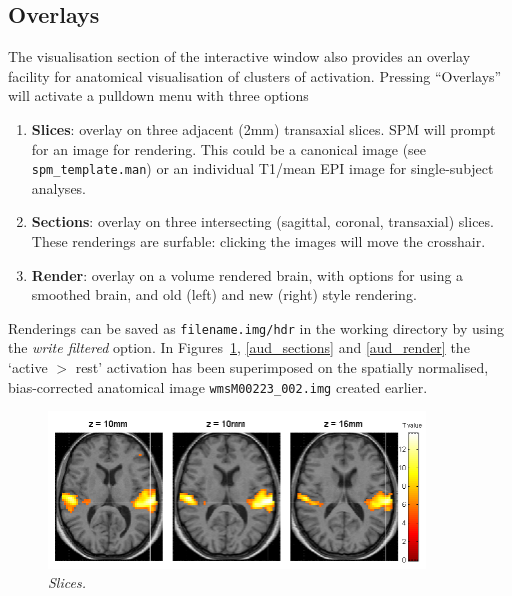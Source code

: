 \subsection{Overlays}

The visualisation section of the interactive window also provides an overlay facility for anatomical visualisation of clusters of activation. Pressing ``Overlays'' will activate a pulldown menu with three options

\begin{enumerate}
\item \textbf{Slices}: overlay on three adjacent (2mm) transaxial slices. SPM will prompt for an image for rendering. This could be a canonical image (see \texttt{spm\_template.man}) or an individual T1/mean EPI image for single-subject analyses.
\item \textbf{Sections}: overlay on three intersecting (sagittal, coronal, transaxial) slices. These renderings are surfable: clicking the images will move the crosshair.
\item \textbf{Render}: overlay on a volume rendered brain, with options for using a smoothed brain, and old (left) and new (right) style rendering.
\end{enumerate}

Renderings can be saved as \texttt{filename.img/hdr} in the working directory by using the {\em write filtered} option. In Figures~\ref{aud_slices}, \ref{aud_sections} and \ref{aud_render} the `active $>$ rest' activation has been superimposed on the spatially normalised, bias-corrected anatomical image \texttt{wmsM00223\_002.img} created earlier. 

\begin{figure}
\begin{center}
\includegraphics[width=100mm]{auditory/slices}
\caption{\emph{Slices.} \label{aud_slices} }
\end{center}
\end{figure}

